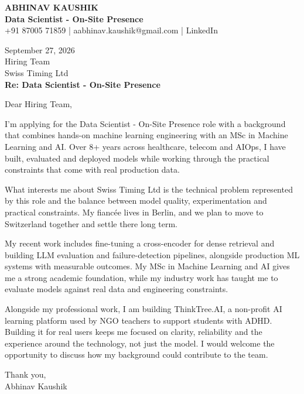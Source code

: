 \documentclass[10pt,a4paper]{article}
\begin{document}
\begin{center}
{\Large\bfseries ABHINAV KAUSHIK}\\[2pt]
{\bfseries Data Scientist - On-Site Presence}\\[2pt]
+91 87005 71859 \quad | \quad aabhinav.kaushik@gmail.com \quad | \quad LinkedIn
\end{center}
\vspace{8pt}
September 27, 2026\\[6pt]
Hiring Team\\
Swiss Timing Ltd\\[4pt]
\textbf{Re: Data Scientist - On-Site Presence}

Dear Hiring Team,

I’m applying for the Data Scientist - On-Site Presence role with a background that combines hands-on machine learning engineering with an MSc in Machine Learning and AI. Over 8+ years across healthcare, telecom and AIOps, I have built, evaluated and deployed models while working through the practical constraints that come with real production data.

What interests me about Swiss Timing Ltd is the technical problem represented by this role and the balance between model quality, experimentation and practical constraints. My fiancée lives in Berlin, and we plan to move to Switzerland together and settle there long term.

My recent work includes fine-tuning a cross-encoder for dense retrieval and building LLM evaluation and failure-detection pipelines, alongside production ML systems with measurable outcomes. My MSc in Machine Learning and AI gives me a strong academic foundation, while my industry work has taught me to evaluate models against real data and engineering constraints.

Alongside my professional work, I am building ThinkTree.AI, a non-profit AI learning platform used by NGO teachers to support students with ADHD. Building it for real users keeps me focused on clarity, reliability and the experience around the technology, not just the model. I would welcome the opportunity to discuss how my background could contribute to the team.

Thank you,\\
Abhinav Kaushik
\end{document}
